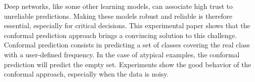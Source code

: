 
Deep networks, like some other learning models, can associate high trust to unreliable predictions. Making these models robust and reliable is therefore essential, especially for critical decisions. This experimental paper shows that the conformal prediction approach brings a convincing solution to this challenge. Conformal prediction consists in predicting a set of classes covering the real class with a user-defined frequency. In the case of atypical examples, the conformal prediction will predict the empty set. Experiments show the good behavior of the conformal approach, especially when the data is noisy.


